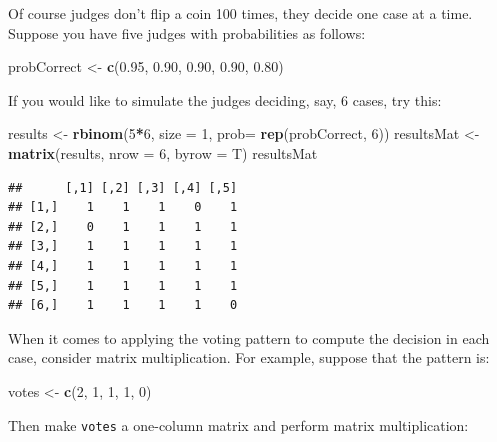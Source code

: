 \documentclass[]{book}
\makeatletter
\newenvironment{Shaded}{\begin{snugshade}}{\end{snugshade}}
\newcommand{\KeywordTok}[1]{\textcolor[rgb]{0.13,0.29,0.53}{\textbf{#1}}}
\newcommand{\DataTypeTok}[1]{\textcolor[rgb]{0.13,0.29,0.53}{#1}}
\newcommand{\DecValTok}[1]{\textcolor[rgb]{0.00,0.00,0.81}{#1}}
\newcommand{\FloatTok}[1]{\textcolor[rgb]{0.00,0.00,0.81}{#1}}
\newcommand{\StringTok}[1]{\textcolor[rgb]{0.31,0.60,0.02}{#1}}
\newcommand{\OperatorTok}[1]{\textcolor[rgb]{0.81,0.36,0.00}{\textbf{#1}}}
\newcommand{\NormalTok}[1]{#1}
\newenvironment{kframe}{%
\medskip{}
\setlength{\fboxsep}{.8em}
 \def\at@end@of@kframe{}%
 \ifinner\ifhmode%
  \def\at@end@of@kframe{\end{minipage}}%
  \begin{minipage}{\columnwidth}%
 \fi\fi%
 \def\FrameCommand##1{\hskip\@totalleftmargin \hskip-\fboxsep
 \colorbox{shadecolor}{##1}\hskip-\fboxsep
     \hskip-\linewidth \hskip-\@totalleftmargin \hskip\columnwidth}%
 \MakeFramed {\advance\hsize-\width
   \@totalleftmargin\z@ \linewidth\hsize
   \@setminipage}}%
 {\par\unskip\endMakeFramed%
 \at@end@of@kframe}
\renewenvironment{Shaded}{\begin{kframe}}{\end{kframe}}
\theoremstyle{definition}
\theoremstyle{definition}
\theoremstyle{definition}
\theoremstyle{remark}
\makeatother
\begin{document}
{\begin{enumerate}
  Of course judges don't flip a coin 100 times, they decide one case at
  a time. Suppose you have five judges with probabilities as follows:

\begin{Shaded}
\begin{Highlighting}[]
\NormalTok{probCorrect <-}\StringTok{ }\KeywordTok{c}\NormalTok{(}\FloatTok{0.95}\NormalTok{, }\FloatTok{0.90}\NormalTok{, }\FloatTok{0.90}\NormalTok{, }\FloatTok{0.90}\NormalTok{, }\FloatTok{0.80}\NormalTok{)}
\end{Highlighting}
\end{Shaded}

  If you would like to simulate the judges deciding, say, 6 cases, try
  this:

\begin{Shaded}
\begin{Highlighting}[]
\NormalTok{results <-}\StringTok{ }\KeywordTok{rbinom}\NormalTok{(}\DecValTok{5}\OperatorTok{*}\DecValTok{6}\NormalTok{, }\DataTypeTok{size =} \DecValTok{1}\NormalTok{, }\DataTypeTok{prob=} \KeywordTok{rep}\NormalTok{(probCorrect, }\DecValTok{6}\NormalTok{))}
\NormalTok{resultsMat <-}\StringTok{ }\KeywordTok{matrix}\NormalTok{(results, }\DataTypeTok{nrow =} \DecValTok{6}\NormalTok{, }\DataTypeTok{byrow =}\NormalTok{ T)}
\NormalTok{resultsMat}
\end{Highlighting}
\end{Shaded}

\begin{verbatim}
##      [,1] [,2] [,3] [,4] [,5]
## [1,]    1    1    1    0    1
## [2,]    0    1    1    1    1
## [3,]    1    1    1    1    1
## [4,]    1    1    1    1    1
## [5,]    1    1    1    1    1
## [6,]    1    1    1    1    0
\end{verbatim}

  When it comes to applying the voting pattern to compute the decision
  in each case, consider matrix multiplication. For example, suppose
  that the pattern is:

\begin{Shaded}
\begin{Highlighting}[]
\NormalTok{votes <-}\StringTok{ }\KeywordTok{c}\NormalTok{(}\DecValTok{2}\NormalTok{, }\DecValTok{1}\NormalTok{, }\DecValTok{1}\NormalTok{, }\DecValTok{1}\NormalTok{, }\DecValTok{0}\NormalTok{)}
\end{Highlighting}
\end{Shaded}

  Then make \texttt{votes} a one-column matrix and perform matrix
  multiplication:


\end{enumerate}}
\end{document}
